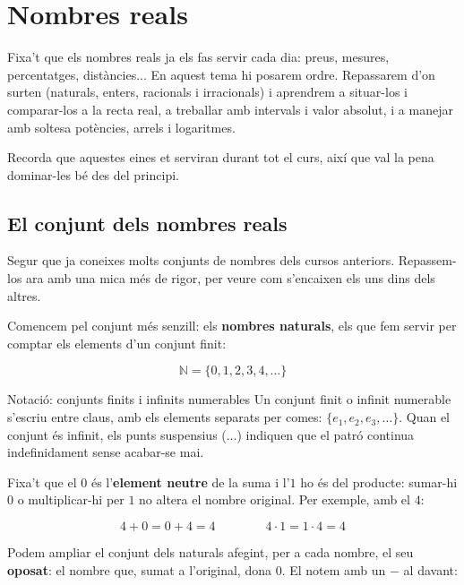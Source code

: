 
\chapter{Nombres reals}

Fixa't que els nombres reals ja els fas servir cada dia: preus, mesures, percentatges, distàncies... En aquest tema hi posarem ordre. Repassarem d'on surten (naturals, enters, racionals i irracionals) i aprendrem a situar-los i comparar-los a la recta real, a treballar amb intervals i valor absolut, i a manejar amb soltesa potències, arrels i logaritmes.

Recorda que aquestes eines et serviran durant tot el curs, així que val la pena dominar-les bé des del principi.

\section{El conjunt dels nombres reals}

Segur que ja coneixes molts conjunts de nombres dels cursos anteriors. Repassem-los ara amb una mica més de rigor, per veure com s'encaixen els uns dins dels altres.

Comencem pel conjunt més senzill: els \textbf{nombres naturals}, els que fem servir per comptar els elements d'un conjunt finit:

\[
\mathbb{N} = \{0, 1, 2, 3, 4, \dots\}
\]

\begin{nota}{Notació: conjunts finits i infinits numerables}
Un conjunt finit o infinit numerable s'escriu entre claus, amb els elements separats per comes: $\{e_1, e_2, e_3, \dots\}$. Quan el conjunt és infinit, els punts suspensius ($\dots$) indiquen que el patró continua indefinidament sense acabar-se mai.
\end{nota}

Fixa't que el $0$ és l'\textbf{element neutre} de la suma i l'$1$ ho és del producte: sumar-hi $0$ o multiplicar-hi per $1$ no altera el nombre original. Per exemple, amb el $4$:

\[
4 + 0 = 0 + 4 = 4 \qquad\qquad 4 \cdot 1 = 1 \cdot 4 = 4
\]

Podem ampliar el conjunt dels naturals afegint, per a cada nombre, el seu \textbf{oposat}: el nombre que, sumat a l'original, dona $0$. El notem amb un $-$ al davant:

